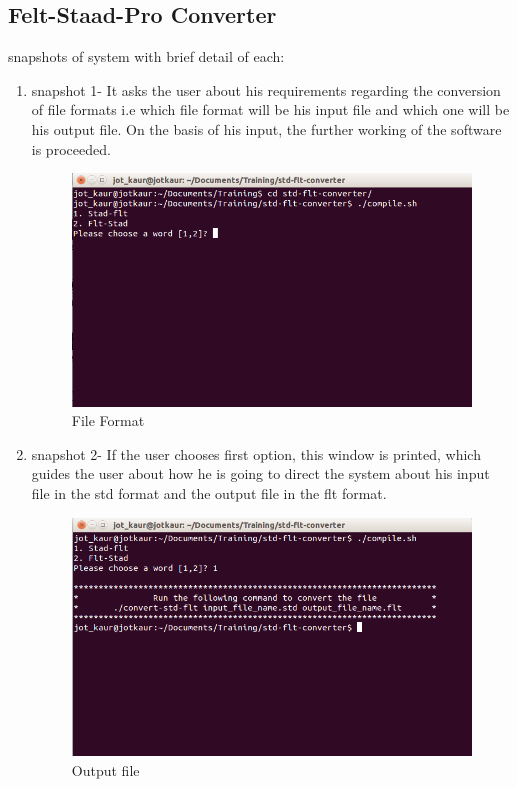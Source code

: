 \subsection{Felt-Staad-Pro Converter}
snapshots of system with brief detail of each:\\
\begin{enumerate}
\item snapshot 1- It asks the user about his requirements regarding the conversion of file formats i.e which file format will be his input file and which one will be his output file. On the basis of his input, the further working of the software is proceeded.
\begin{figure} [h!]
\centering
\includegraphics[scale=0.3]{images/1.png}
\caption{File Format }
\end{figure}

\item snapshot 2- If the user chooses first option, this window is printed, which guides the user about how he is going to direct the system about his input file in the std format and the output file in the flt format.
\begin{figure} [h!]
\centering
\includegraphics[scale=0.3]{images/2.png}
\caption{Output file}
\end{figure}


\end{enumerate}
